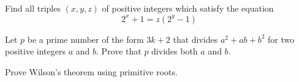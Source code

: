 \begin{problem}
	Find all triples $(x,y,z)$ of positive integers which satisfy the equation $$2^x+1=z(2^y-1)$$ %
\end{problem}

%
%
%
%
%
%


\begin{problem}
	Let $p$ be a prime number of the form $3k+2$ that divides $a^2+ab+b^2$ for two positive integers $a$ and $b$. Prove that $p$ divides both $a$ and $b$. %
\end{problem}

%


\begin{problem}
	Prove Wilson's theorem using primitive roots.
\end{problem}


